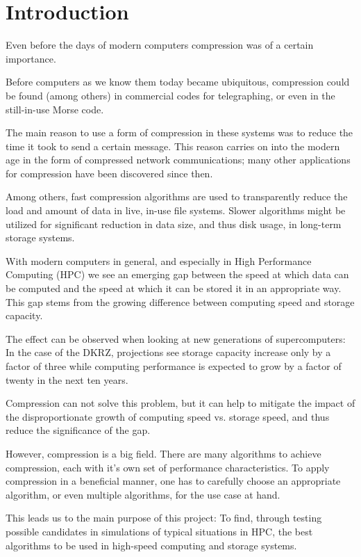 \documentclass[
	12pt,
	a4paper,
	BCOR10mm,
	DIV14,
	listof=totoc,
	bibliography=totoc,
	headsepline
]{scrreprt}
\begin{document}
\tableofcontents

\chapter{Introduction}
\label{Introduction}

Even before the days of modern computers compression was of a certain importance.

Before computers as we know them today became ubiquitous, compression could be found (among others) in commercial codes for telegraphing\cite{com}, or even in the still-in-use Morse code.

The main reason to use a form of compression in these systems was to reduce the time it took to send a certain message. This reason carries on into the modern age in the form of compressed network communications; many other applications for compression have been discovered since then.

Among others, fast compression algorithms are used to transparently reduce the load and amount of data in live, in-use file systems. Slower algorithms might be utilized for significant reduction in data size, and thus disk usage, in long-term storage systems.

With modern computers in general, and especially in High Performance Computing (HPC) we see an emerging gap between the speed at which data can be computed and the speed at which it can be stored it in an appropriate way.
This gap stems from the growing difference between computing speed and storage capacity\cite{ExaStoSy}.

The effect can be observed when looking at new generations of supercomputers:
In the case of the DKRZ, projections see storage capacity increase only by a factor of three while computing performance is expected to grow by a factor of twenty in the next ten years\cite{ExaStoSy}.

Compression can not solve this problem, but it can help to mitigate the impact of the disproportionate growth of computing speed vs. storage speed, and thus reduce the significance of the gap.

However, compression is a big field. There are many algorithms to achieve compression, each with it's own set of performance characteristics. To apply compression in a beneficial manner, one has to carefully choose an appropriate algorithm, or even multiple algorithms, for the use case at hand.

This leads us to the main purpose of this project: To find, through testing possible candidates in simulations of typical situations in HPC, the best algorithms to be used in high-speed computing and storage systems.
\end{document}
